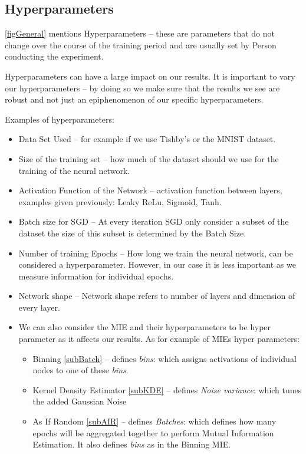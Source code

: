 \documentclass[dissertation.tex]{subfiles}
\begin{document}
\subsection{Hyperparameters}
\label{subHyperParameters}

\autoref{figGeneral} mentions Hyperparameters -- these are parameters that do
not change over the course of the training period and are usually set by Person
conducting the experiment.  

Hyperparameters can have a large impact on our results. It is important to vary
our hyperparameters -- by doing so we make sure that the results we see are
robust and not just an epiphenomenon of our specific hyperparameters.

Examples of hyperparameters:
\begin{itemize}
  \item{
      Data Set Used -- for example if we use Tishby's\cite{DATATISHBY}
      or the MNIST\cite{DATAMNIST} dataset.
    }
  \item{
      Size of the training set -- how much of the dataset should we use for the
      training of the neural network.
    }
  \item{
      Activation Function of the Network -- activation function between layers,
      examples given previously: Leaky ReLu, Sigmoid, Tanh.
    }
  \item{
      Batch size for SGD -- At every iteration SGD only consider a subset of the
      dataset the size of this subset is determined by the Batch Size.
    }
  \item{
      Number of training Epochs -- How long we train the neural network, can be
      considered a hyperparameter. However, in our case it is less important as
      we measure information for individual epochs.
    }
  \item{
      Network shape -- Network shape refers to number of layers and dimension of
      every layer. 
    }
  \item{
      We can also consider the MIE and their hyperparameters to be hyper
      parameter as it affects our results. As for example of MIEs hyper
      parameters: 
      \begin{itemize}
        \item{
            Binning \autoref{subBatch} -- defines \emph{bins}: which assigns
            activations of individual nodes to one of these \emph{bins}.
          }
        \item{
            Kernel Density Estimator \autoref{subKDE} -- defines \emph{Noise
            variance}: which tunes the added Gaussian Noise
          }
        \item{
            As If Random \autoref{subAIR} -- defines \emph{Batches}: which defines how
            many epochs will be aggregated together to perform Mutual
            Information Estimation. It also defines \emph{bins} as in the
            Binning MIE.
          }
      \end{itemize}
    }
\end{itemize}
\end{document}
